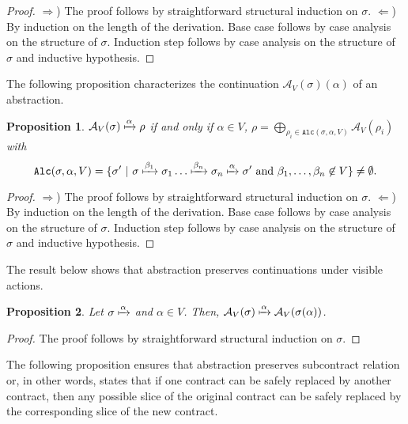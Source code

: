 \documentclass[submission,copyright,creativecommons]{eptcs}
\newtheorem{proposition}{Proposition}
\begin{document}
\begin{proof} $\Rightarrow$) The proof follows by straightforward structural induction on $\sigma$. 
$\Leftarrow$) By induction on the length of the derivation. Base case follows by case analysis on the 
structure of $\sigma$. Induction step follows by case analysis on the structure of $\sigma$ and inductive hypothesis.
\end{proof}

The following proposition characterizes the continuation $\mathcal{A}_V(\sigma)(\alpha)$ of an abstraction.
 
\begin{proposition} 
\label{redabstraccion}
  $\mathcal{A}_V(\sigma) \xmapsto{\alpha}\rho$ if and only if
  $\alpha\in V$, $\rho = \bigoplus_{\rho_i\in \mathtt{Alc}(\sigma,\alpha,V)} \mathcal{A}_V(\rho_i)$ with
 \[\mathtt{Alc}(\sigma,\alpha,V) = \{\sigma'\ |\ \sigma\xmapsto{\beta_1}\sigma_1\ldots\xmapsto{\beta_n}\sigma_n\xmapsto{\alpha}\sigma'\ \mbox{and}\ \beta_1,\ldots,\beta_n\not\in V\}  \neq\emptyset.\]
\end{proposition}

\begin{proof} $\Rightarrow$) The proof follows by straightforward structural induction on $\sigma$. 
$\Leftarrow$) By induction on the length of the derivation.  Base case follows by case analysis on the 
structure of $\sigma$. Induction step follows by case analysis on the structure of $\sigma$ and inductive hypothesis. 
\end{proof}

The result below shows that abstraction preserves continuations under visible actions.

\begin{proposition} 
\label{prop:abstofvisiblered}
Let $\sigma\xmapsto{\alpha}$ and $\alpha\in V$. Then, $\mathcal{A}_V(\sigma) \xmapsto{\alpha} \mathcal{A}_V(\sigma(\alpha))$.
\end{proposition}

\begin{proof} The proof follows by straightforward structural induction on $\sigma$.
\end{proof}

The following proposition ensures that abstraction preserves subcontract relation or, in 
other words, states that if one contract can be safely replaced by another contract, 
then any possible slice of the original contract can be safely replaced by the corresponding
slice of the new contract. 
\end{document}
